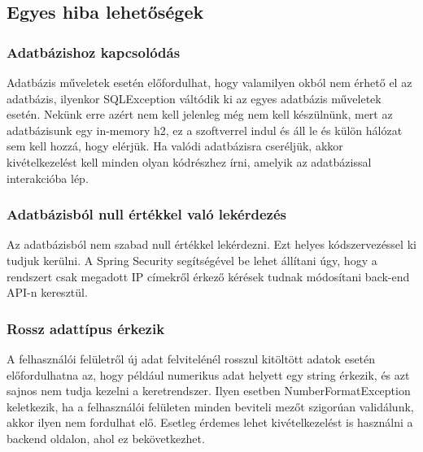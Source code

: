 \subsection{Egyes hiba lehetőségek}

\subsubsection{Adatbázishoz kapcsolódás}
Adatbázis műveletek esetén előfordulhat, hogy valamilyen okból nem érhető el az adatbázis, ilyenkor SQLException váltódik ki az egyes adatbázis műveletek esetén. Nekünk erre azért nem kell jelenleg még nem kell készülnünk, mert az adatbázisunk egy in-memory h2, ez a szoftverrel indul és áll le és külön hálózat sem kell hozzá, hogy elérjük. Ha valódi adatbázisra cseréljük, akkor kivételkezelést kell minden olyan kódrészhez írni, amelyik az adatbázissal interakcióba lép.

\subsubsection{Adatbázisból null értékkel való lekérdezés}
Az adatbázisból nem szabad null értékkel lekérdezni. Ezt helyes kódszervezéssel ki tudjuk kerülni. A Spring Security segítségével be lehet állítani úgy, hogy a rendszert csak megadott IP címekről érkező kérések tudnak módosítani back-end API-n keresztül.

\subsubsection{Rossz adattípus érkezik}
A felhasználói felületről új adat felvitelénél rosszul kitöltött adatok esetén előfordulhatna az, hogy például numerikus adat helyett egy string érkezik, és azt sajnos nem tudja kezelni a keretrendszer. Ilyen esetben NumberFormatException keletkezik, ha a felhasználói felületen minden beviteli mezőt szigorúan validálunk, akkor ilyen nem fordulhat elő. Esetleg érdemes lehet kivételkezelést is használni a backend oldalon, ahol ez bekövetkezhet. 

